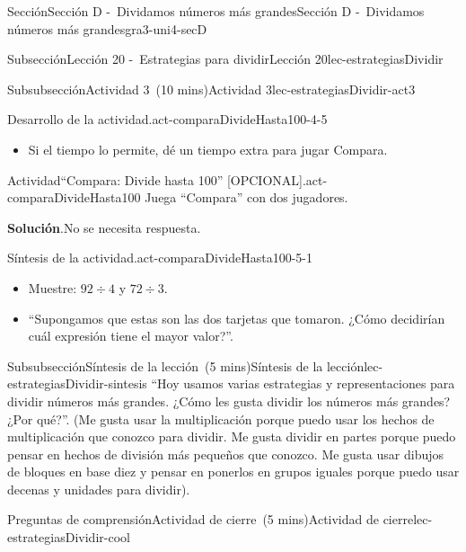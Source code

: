 \documentclass[oneside,10pt,]{article}
\newcommand{\blocktitlefont}{\relax}
\begin{document}
\begin{sectionptx}{Sección}{Sección D -~Dividamos números más grandes}{}{Sección D -~Dividamos números más grandes}{}{}{gra3-uni4-secD}
\begin{subsectionptx}{Subsección}{Lección 20 -~Estrategias para dividir}{}{Lección 20}{}{}{lec-estrategiasDividir}
\begin{subsubsectionptx}{Subsubsección}{Actividad 3~(10 mins)}{}{Actividad 3}{}{}{lec-estrategiasDividir-act3}
\begin{paragraphs}{Desarrollo de la actividad.}{act-comparaDivideHasta100-4-5}
\begin{itemize}[label=\textbullet]
\item{}Si el tiempo lo permite, dé un tiempo extra para jugar Compara.%
\end{itemize}
\end{paragraphs}%
\begin{activity}{Actividad}{“Compara: Divide hasta 100” [OPCIONAL].}{act-comparaDivideHasta100}%
Juega ``Compara'' con dos jugadores.%
\par\smallskip%
\noindent\textbf{\blocktitlefont Solución}.\hypertarget{act-comparaDivideHasta100-3}{}\quad{}No se necesita respuesta.%
\end{activity}%
%
\par
\begin{paragraphs}{Síntesis de la actividad.}{act-comparaDivideHasta100-5-1}%
%
\begin{itemize}[label=\textbullet]
\item{}Muestre: \(92 \div 4\) y \(72 \div 3\).%
\item{}``Supongamos que estas son las dos tarjetas que tomaron. ¿Cómo decidirían cuál expresión tiene el mayor valor?''.%
\end{itemize}
\end{paragraphs}%
\end{subsubsectionptx}
%
%
\typeout{************************************************}
\typeout{************************************************}
%
\begin{subsubsectionptx}{Subsubsección}{Síntesis de la lección~(5 mins)}{}{Síntesis de la lección}{}{}{lec-estrategiasDividir-sintesis}
``Hoy usamos varias estrategias y representaciones para dividir números más grandes. ¿Cómo les gusta dividir los números más grandes? ¿Por qué?''. (Me gusta usar la multiplicación porque puedo usar los hechos de multiplicación que conozco para dividir. Me gusta dividir en partes porque puedo pensar en hechos de división más pequeños que conozco. Me gusta usar dibujos de bloques en base diez y pensar en ponerlos en grupos iguales porque puedo usar decenas y unidades para dividir).%
\end{subsubsectionptx}
%
%
\typeout{************************************************}
\typeout{************************************************}
%
\begin{reading-questions-subsubsection}{Preguntas de comprensión}{Actividad de cierre~(5 mins)}{}{Actividad de cierre}{}{}{lec-estrategiasDividir-cool}

\end{reading-questions-subsubsection}
\end{subsectionptx}
\end{sectionptx}
\end{document}
